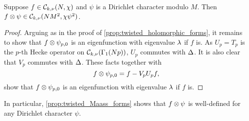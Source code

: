     \begin{proposition}\label{prop:twisted_Maass_forms}
      Suppose $f \in \mathcal{C}_{k,\nu}(N,\chi)$ and $\psi$ is a Dirichlet character modulo $M$. Then $f \otimes \psi \in \mathcal{C}_{k,\nu}(NM^{2},\chi\psi^{2})$.
    \end{proposition}
    \begin{proof}
      Arguing as in the proof of \cref{prop:twisted_holomorphic_forms}, it remains to show that $f \otimes \psi_{p,0}$ is an eigenfunction with eigenvalue $\lambda$ if $f$ is. As $U_{p} = T_{p}$ is the $p$-th Hecke operator on $\mathcal{C}_{k,\nu}(\Gamma_{1}(Np))$, $U_{p}$ commutes with $\Delta$. It is also clear that $V_{p}$ commutes with $\Delta$. These facts together with
      \[
        f \otimes \psi_{p,0} = f-V_{p}U_{p}f,
      \]
      show that $f \otimes \psi_{p,0}$ is an eigenfunction with eigenvalue $\lambda$ if $f$ is.
    \end{proof}

    In particular, \cref{prop:twisted_Maass_forms} shows that $f \otimes \psi$ is well-defined for any Dirichlet character $\psi$.